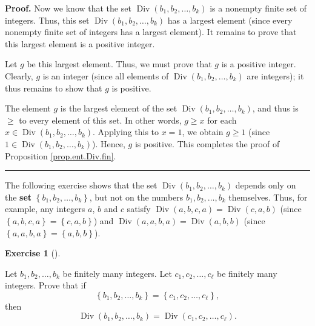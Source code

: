 \documentclass[numbers=enddot,12pt,final,onecolumn,notitlepage]{scrartcl}%
\newcounter{exer}
\numberwithin{exer}{subsection}
\theoremstyle{definition}
\newtheorem{exmp}[exer]{Exercise}
\newenvironment{exercise}[1][]
{\begin{exmp}[#1]\begin{leftbar}}
{\end{leftbar}\end{exmp}}
\newenvironment{proof}[1][Proof]{\noindent\textbf{#1.} }{\ \rule{0.5em}{0.5em}}
\begin{document}
\begin{proof}
Now we know that the set $\operatorname*{Div}\left(  b_{1},b_{2},\ldots
,b_{k}\right)  $ is a nonempty finite set of integers. Thus, this set
$\operatorname*{Div}\left(  b_{1},b_{2},\ldots,b_{k}\right)  $ has a largest
element (since every nonempty finite set of integers has a largest element).
It remains to prove that this largest element is a positive integer.

Let $g$ be this largest element. Thus, we must prove that $g$ is a positive
integer. Clearly, $g$ is an integer (since all elements of
$\operatorname*{Div}\left(  b_{1},b_{2},\ldots,b_{k}\right)  $ are integers);
it thus remains to show that $g$ is positive.

The element $g$ is the largest element of the set $\operatorname*{Div}\left(
b_{1},b_{2},\ldots,b_{k}\right)  $, and thus is $\geq$ to every element of
this set. In other words, $g\geq x$ for each $x\in\operatorname*{Div}\left(
b_{1},b_{2},\ldots,b_{k}\right)  $. Applying this to $x=1$, we obtain $g\geq1$
(since $1\in\operatorname*{Div}\left(  b_{1},b_{2},\ldots,b_{k}\right)  $).
Hence, $g$ is positive. This completes the proof of Proposition
\ref{prop.ent.Div.fin}.
\end{proof}

The following exercise shows that the set $\operatorname*{Div}\left(
b_{1},b_{2},\ldots,b_{k}\right)  $ depends only on the \textbf{set} $\left\{
b_{1},b_{2},\ldots,b_{k}\right\}  $, but not on the numbers $b_{1}%
,b_{2},\ldots,b_{k}$ themselves. Thus, for example, any integers $a$, $b$ and
$c$ satisfy $\operatorname*{Div}\left(  a,b,c,a\right)  =\operatorname*{Div}%
\left(  c,a,b\right)  $ (since $\left\{  a,b,c,a\right\}  =\left\{
c,a,b\right\}  $) and $\operatorname*{Div}\left(  a,a,b,a\right)
=\operatorname*{Div}\left(  a,b,b\right)  $ (since $\left\{  a,a,b,a\right\}
=\left\{  a,b,b\right\}  $).

\begin{exercise}
\label{exe.ent.Div.set}Let $b_{1},b_{2},\ldots,b_{k}$ be finitely many
integers. Let $c_{1},c_{2},\ldots,c_{\ell}$ be finitely many integers. Prove
that if%
\[
\left\{  b_{1},b_{2},\ldots,b_{k}\right\}  =\left\{  c_{1},c_{2}%
,\ldots,c_{\ell}\right\}  ,
\]
then%
\[
\operatorname*{Div}\left(  b_{1},b_{2},\ldots,b_{k}\right)
=\operatorname*{Div}\left(  c_{1},c_{2},\ldots,c_{\ell}\right)  .
\]

\end{exercise}
\end{document}
